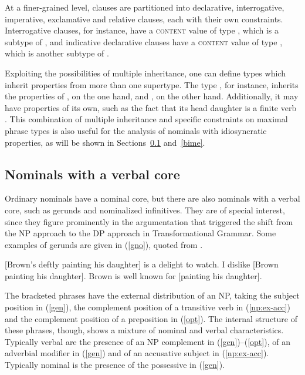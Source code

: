 \documentclass[output=paper,biblatex,babelshorthands,newtxmath,draftmode,colorlinks,citecolor=brown]{langscibook}
\begin{document}
\noindent
At a finer-grained level, clauses are partitioned into 
declarative, interrogative, imperative, exclamative and relative
clauses, each with their own constraints. 
Interrogative clauses, for instance, have a \textsc{content} value of type 
, which is a subtype of , and 
indicative declarative clauses have a \textsc{content} value of type 
, which is another subtype of .

Exploiting the possibilities of multiple inheritance, one can 
define types which inherit properties from more than one supertype. 
The type , for instance, inherits 
the properties of , on the one hand, and 
, on the other hand. Additionally, it may 
have properties of its own, such as the fact that its head daughter 
is a finite verb \citep[43]{GS00}. 
This combination of multiple inheritance and specific   
constraints on maximal phrase types is also useful for the analysis of 
nominals with idiosyncratic properties, as will be shown in Sections~\ref{geru} 
and~\ref{bime}. 


\subsection{Nominals with a verbal core} 
\label{geru}


Ordinary nominals have a nominal core, but there are also nominals  
with a verbal core, such as gerunds and nominalized infinitives. They are 
of special interest, since they figure prominently in the argumentation 
that triggered the shift from the NP approach to the DP approach in Transformational 
Grammar. Some examples of gerunds are given in (\ref{gno}), 
quoted from \citet[1290]{Quirketal85}. 

\begin{exe} 
\ex\label{gno}
\begin{xlist}
\ex\label{gen}  {}[Brown's deftly painting his daughter] is a delight to watch. 
\ex\label{np:ex-acc}  I dislike [Brown painting his daughter]. 
\ex\label{opt}  Brown is well known for [painting his daughter].
\end{xlist}
\end{exe}

\noindent
The bracketed phrases have the external distribution of an NP, 
taking the subject position in (\ref{gen}), 
the complement position of a transitive verb in (\ref{np:ex-acc}) and 
the complement position of a preposition in (\ref{opt}). 
The internal structure of these phrases, though, shows a mixture of nominal and verbal 
characteristics. 
Typically verbal are the presence of an NP complement in (\ref{gen})--(\ref{opt}), 
of an adverbial modifier in (\ref{gen}) and of an accusative subject in (\ref{np:ex-acc}). 
Typically nominal is the presence of the possessive in (\ref{gen}). 
\end{document}
